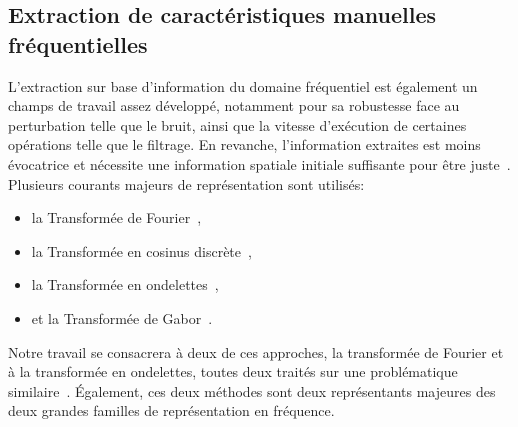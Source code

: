\subsection{Extraction de caractéristiques manuelles fréquentielles}
L'extraction sur base d'information du domaine fréquentiel est également un champs de travail assez développé, notamment pour sa robustesse face au perturbation telle que le bruit, ainsi que la vitesse d'exécution de certaines opérations telle que le filtrage. En revanche, l'information extraites est moins évocatrice et nécessite une information spatiale initiale suffisante pour être juste~\cite{Kamila2015}. Plusieurs courants majeurs de représentation sont utilisés: 
\begin{itemize}
    \item la Transformée de Fourier~\cite{Ursani2007, Smach2008a},
    \item la Transformée en cosinus discrète~\cite{Sorwar2001},
    \item la Transformée en ondelettes~\cite{Arivazhagan2003,Hong2010},
    \item et la Transformée de Gabor~\cite{Ursani2007}.
\end{itemize}
Notre travail se consacrera à deux de ces approches, la transformée de Fourier et à la transformée en ondelettes, toutes deux traités sur une problématique similaire~\cite{Wiltgen2008,Halimi2017a,Halimi2017b}. Également, ces deux méthodes sont deux représentants majeures des deux grandes familles de représentation en fréquence.\par

